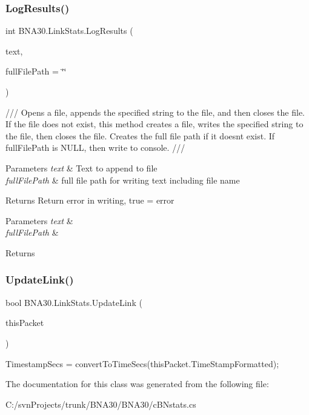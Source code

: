 \subsubsection{\texorpdfstring{LogResults()}{LogResults()}}
{\footnotesize\ttfamily int B\+N\+A30.\+Link\+Stats.\+Log\+Results (\begin{DoxyParamCaption}\item[{string}]{text,  }\item[{string}]{full\+File\+Path = {\ttfamily \char`\"{}\char`\"{}} }\end{DoxyParamCaption})\hspace{0.3cm}{\ttfamily [inline]}}



/// Opens a file, appends the specified string to the file, and then closes the file. If the file does not exist, this method creates a file, writes the specified string to the file, then closes the file. Creates the full file path if it doesn\textquotesingle{}t exist. If full\+File\+Path is N\+U\+LL, then write to console. /// 


\begin{DoxyParams}{Parameters}
{\em text} & Text to append to file\\
\hline
{\em full\+File\+Path} & full file path for writing text including file name\\
\hline
\end{DoxyParams}
\begin{DoxyReturn}{Returns}
Return error in writing, true = error 
\end{DoxyReturn}

\begin{DoxyParams}{Parameters}
{\em text} & \\
\hline
{\em full\+File\+Path} & \\
\hline
\end{DoxyParams}
\begin{DoxyReturn}{Returns}

\end{DoxyReturn}
\mbox{\label{class_b_n_a30_1_1_link_stats_ada837e00b3cf5168e8f7a145ce08b69d}} 
\subsubsection{\texorpdfstring{UpdateLink()}{UpdateLink()}}
{\footnotesize\ttfamily bool B\+N\+A30.\+Link\+Stats.\+Update\+Link (\begin{DoxyParamCaption}\item[{\mbox{\hyperlink{struct_b_n_a30_1_1_b_nstorage_1_1_p_a_c_k_e_tstruct}{B\+Nstorage.\+P\+A\+C\+K\+E\+Tstruct}}}]{this\+Packet }\end{DoxyParamCaption})\hspace{0.3cm}{\ttfamily [inline]}}

Timestamp\+Secs = convert\+To\+Time\+Secs(this\+Packet.\+Time\+Stamp\+Formatted); 

The documentation for this class was generated from the following file\+:\begin{DoxyCompactItemize}
\item 
C\+:/svn\+Projects/trunk/\+B\+N\+A30/\+B\+N\+A30/c\+B\+Nstats.\+cs\end{DoxyCompactItemize}
